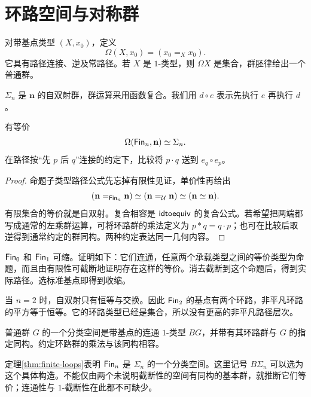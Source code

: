 \section{环路空间与对称群}
\begin{definition}[基点环路]
对带基点类型 $(X,x_0)$，定义
\[
\Omega(X,x_0)=(x_0=_Xx_0).
\]
它具有路径连接、逆及常路径。若 $X$ 是 $1$-类型，则 $\Omega X$ 是集合，群胚律给出一个普通群。
\end{definition}
\begin{definition}[对称群]
$\Sigma_n$ 是 $\mathbf n$ 的自双射群，群运算采用函数复合。我们用 $d\circ e$ 表示先执行 $e$ 再执行 $d$。
\end{definition}
\begin{theorem}[有限类型的环路计算]\label{thm:finite-loops}
有等价
\[
\Omega(\mathsf{Fin}_n,\mathbf n)\simeq\Sigma_n.
\]
在路径按“先 $p$ 后 $q$”连接的约定下，比较将 $p\cdot q$ 送到 $e_q\circ e_p$。
\end{theorem}
\begin{proof}
命题子类型路径公式先忘掉有限性见证，单价性再给出
\[
(\mathbf n=_{\mathsf{Fin}_n}\mathbf n)
\simeq(\mathbf n=_{\mathcal U}\mathbf n)
\simeq(\mathbf n\simeq\mathbf n).
\]
有限集合的等价就是自双射。复合相容是 $\mathsf{idtoequiv}$ 的复合公式。若希望把两端都写成通常的左乘群运算，可将环路群的乘法定义为 $p*q=q\cdot p$；也可在比较后取逆得到通常约定的群同构。两种约定表达同一几何内容。
\end{proof}
\begin{example}
$\mathsf{Fin}_0$ 和 $\mathsf{Fin}_1$ 可缩。证明如下：它们连通，任意两个承载类型之间的等价类型为命题，而且由有限性可截断地证明存在这样的等价。消去截断到这个命题后，得到实际路径。选标准基点即得到收缩。

当 $n=2$ 时，自双射只有恒等与交换。因此 $\mathsf{Fin}_2$ 的基点有两个环路，非平凡环路的平方等于恒等。它的环路类型已经是集合，所以没有更高的非平凡路径层次。
\end{example}
\begin{definition}[群的分类空间]
普通群 $G$ 的一个分类空间是带基点的连通 $1$-类型 $BG$，并带有其环路群与 $G$ 的指定同构。约定环路群的乘法与该同构相容。
\end{definition}
\begin{remark}
定理\ref{thm:finite-loops}表明 $\mathsf{Fin}_n$ 是 $\Sigma_n$ 的一个分类空间。这里记号 $B\Sigma_n$ 可以选为这个具体构造。不能仅由两个未说明截断性的空间有同构的基本群，就推断它们等价；连通性与 $1$-截断性在此都不可缺少。
\end{remark}

